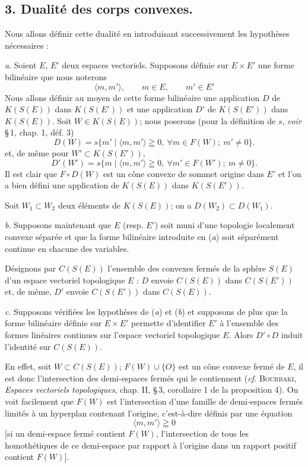 \documentclass[11pt]{article}
\newcommand{\bzcf}[2]{#1}
\begin{document}
\subsection*{3. Dualité des corps convexes.}

Nous allons définir cette dualité en introduisant successivement les hypothèses nécessaires :

\textit{a}. Soient $E$, $E'$ deux espaces vectoriels. Supposons définie sur $E\times E'$ une
forme bilinéaire que nous noterons
\[ \langle m, m'\rangle,\qquad m\in E,\qquad m'\in E' \]
Nous allons définir au moyen de cette forme bilinéaire une application $D$ de $K(S(E))$ dans
$K(S(E'))$ et une application $D'$ de $K(S(E'))$ dans $K(S(E))$.
Soit $W\in K(S(E))$; nous poserons (pour la définition de $s$, \textit{voir} \bzcf{\S\,1,
chap. 1, déf. 3}{\ref{bzdef:c1s1d3_sphere}})
\[ D(W)=s\{m'\mid\langle m, m'\rangle\geqq 0,\ \forall m\in F(W);\ m'\neq 0\}. \]
et, de même pour $W'\subset K(S(E'))$,
\[ D'(W')=s\{m\mid\langle m, m'\rangle\geqq 0,\ \forall m'\in F(W');\ m\neq 0\}. \]
Il est clair que $F\circ D(W)$ est un cône convexe de sommet origine dans $E'$ et l'on a bien
défini une application de $K(S(E))$ dans $K(S(E'))$.

Soit $W_1\subset W_2$ deux éléments de $K(S(E))$; on a $D(W_2)\subset D(W_1)$.

\textit{b}. Supposons maintenant que $E$ (resp. $E'$) soit muni d'une topologie localement
convexe séparée et que la forme bilinéaire introduite en (\textit{a}) soit séparément continue en
chacune des variables.

Désignons par $C(S(E))$ l'ensemble des convexes fermés de la sphère $S(E)$ d'un espace vectoriel
topologique $E$ : $D$ envoie $C(S(E))$ dans $C(S(E'))$ et, de même, $D'$ envoie $C(S(E'))$ dans
$C(S(E))$.

\textit{c}. Supposons vérifiées les hypothèses de (\textit{a}) et (\textit{b}) et supposons de
plus que la forme bilinéaire définie sur $E\times E'$ permette d'identifier $E'$ à l'ensemble des
formes linéaires continues sur l'espace vectoriel topologique $E$. Alors $D'\circ D$ induit
l'identité sur $C(S(E))$.

En effet, soit $W\subset C(S(E))$; $F(W)\cup\{O\}$ est un cône convexe fermé de $E$, il est donc
l'intersection des demi-espaces fermés qui le contiennent (\textit{cf.} \textsc{Bourbaki},
\textit{Espaces vectoriels topologiques}, chap. II, \S\,3, corollaire 1 de la proposition 4). On
voit facilement que $F(W)$ est l'intersection d'une famille de demi-espaces fermés limités à un
hyperplan contenant l'origine, c'est-à-dire définis par une équation
\[ \langle m, m'\rangle\geqq 0 \]
[si un demi-espace fermé contient $F(W)$, l'intersection de tous les homothétiques de ce
demi-espace par rapport à l'origine dans un rapport positif contient $F(W)$].
\end{document}
